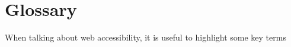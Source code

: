 \documentclass[ %
                    author={Aleena Baig},
                supervisor={Dr Simon Lock},
                    degree={BSc},
                     title={On Making Web Accessible Graphs},
                  subtitle={},
                      year={2019} ]{dissertation}
\begin{document}


\chapter{Glossary}


When talking about web accessibility, it is useful to highlight some key terms

\BlankLine
%
\glsaddall
\printglossary[nonumberlist]

\printbibliography


\end{document}
